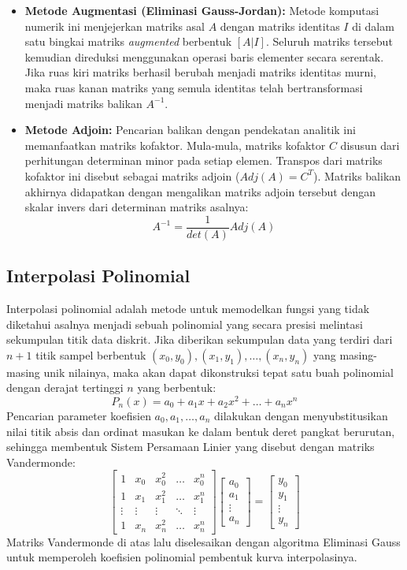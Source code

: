 \documentclass[12pt, a4paper]{article}
\begin{document}
\begin{itemize}
    \item \textbf{Metode Augmentasi (Eliminasi Gauss-Jordan):} Metode komputasi numerik ini menjejerkan matriks asal $A$ dengan matriks identitas $I$ di dalam satu bingkai matriks \textit{augmented} berbentuk $[A|I]$. Seluruh matriks tersebut kemudian direduksi menggunakan operasi baris elementer secara serentak. Jika ruas kiri matriks berhasil berubah menjadi matriks identitas murni, maka ruas kanan matriks yang semula identitas telah bertransformasi menjadi matriks balikan $A^{-1}$.
    \item \textbf{Metode Adjoin:} Pencarian balikan dengan pendekatan analitik ini memanfaatkan matriks kofaktor. Mula-mula, matriks kofaktor $C$ disusun dari perhitungan determinan minor pada setiap elemen. Transpos dari matriks kofaktor ini disebut sebagai matriks adjoin ($Adj(A) = C^T$). Matriks balikan akhirnya didapatkan dengan mengalikan matriks adjoin tersebut dengan skalar invers dari determinan matriks asalnya:
    $$A^{-1} = \frac{1}{det(A)}Adj(A)$$
\end{itemize}

\subsection{Interpolasi Polinomial}
Interpolasi polinomial adalah metode untuk memodelkan fungsi yang tidak diketahui asalnya menjadi sebuah polinomial yang secara presisi melintasi sekumpulan titik data diskrit. Jika diberikan sekumpulan data yang terdiri dari $n+1$ titik sampel berbentuk $(x_0, y_0), (x_1, y_1), \dots, (x_n, y_n)$ yang masing-masing unik nilainya, maka akan dapat dikonstruksi tepat satu buah polinomial dengan derajat tertinggi $n$ yang berbentuk:
$$P_n(x) = a_0 + a_1x + a_2x^2 + \dots + a_nx^n$$
Pencarian parameter koefisien $a_0, a_1, \dots, a_n$ dilakukan dengan menyubstitusikan nilai titik absis dan ordinat masukan ke dalam bentuk deret pangkat berurutan, sehingga membentuk Sistem Persamaan Linier yang disebut dengan matriks Vandermonde:
$$ \begin{bmatrix} 1 & x_0 & x_0^2 & \dots & x_0^n \\ 1 & x_1 & x_1^2 & \dots & x_1^n \\ \vdots & \vdots & \vdots & \ddots & \vdots \\ 1 & x_n & x_n^2 & \dots & x_n^n \end{bmatrix} \begin{bmatrix} a_0 \\ a_1 \\ \vdots \\ a_n \end{bmatrix} = \begin{bmatrix} y_0 \\ y_1 \\ \vdots \\ y_n \end{bmatrix} $$
Matriks Vandermonde di atas lalu diselesaikan dengan algoritma Eliminasi Gauss untuk memperoleh koefisien polinomial pembentuk kurva interpolasinya.
\end{document}
